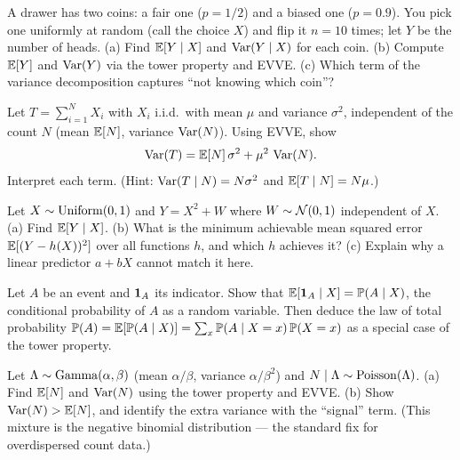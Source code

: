 \begin{exercise}
\label{ch15:exr-mixture}
A drawer has two coins: a fair one ($p=1/2$) and a biased one ($p=0.9$). You pick one uniformly at
random (call the choice $X$) and flip it $n = 10$ times; let $Y$ be the number of heads. (a) Find
$\operatorname{\mathbb{E}}[Y\mid X]$ and $\operatorname{Var}(Y\mid X)$ for each coin. (b) Compute $\operatorname{\mathbb{E}}[Y]$ and $\operatorname{Var}(Y)$ via the tower
property and EVVE. (c) Which term of the variance decomposition captures ``not knowing which coin''?
\end{exercise}

\begin{exercise}
\label{ch15:exr-random-sum}
Let $T = \sum_{i=1}^N X_i$ with $X_i$ i.i.d.\ with mean $\mu$ and variance $\sigma^2$, independent of the count
$N$ (mean $\operatorname{\mathbb{E}}[N]$, variance $\operatorname{Var}(N)$). Using EVVE, show
\[
  \operatorname{Var}(T) = \operatorname{\mathbb{E}}[N]\,\sigma^2 + \mu^2\,\operatorname{Var}(N).
\]
Interpret each term. (Hint: $\operatorname{Var}(T\mid N) = N\sigma^2$ and $\operatorname{\mathbb{E}}[T\mid N] = N\mu$.)
\end{exercise}

\begin{exercise}
\label{ch15:exr-best}
Let $X \sim \operatorname{Uniform}(0,1)$ and $Y = X^2 + W$ where $W \sim \mathcal{N}(0, 1)$ independent of $X$. (a) Find
$\operatorname{\mathbb{E}}[Y\mid X]$. (b) What is the minimum achievable mean squared error $\operatorname{\mathbb{E}}[(Y - h(X))^2]$ over all
functions $h$, and which $h$ achieves it? (c) Explain why a linear predictor $a + bX$ cannot match it
here.
\end{exercise}

\begin{exercise}
\label{ch15:exr-indicator}
Let $A$ be an event and $\mathbf{1}_A$ its indicator. Show that $\operatorname{\mathbb{E}}[\mathbf{1}_A \mid X] = \operatorname{\mathbb{P}}(A \mid X)$, the
conditional probability of $A$ as a random variable. Then deduce the law of total probability
$\operatorname{\mathbb{P}}(A) = \operatorname{\mathbb{E}}[\operatorname{\mathbb{P}}(A\mid X)] = \sum_x \operatorname{\mathbb{P}}(A\mid X=x)\operatorname{\mathbb{P}}(X=x)$ as a special case of the tower property.
\end{exercise}

\begin{exercise}[Overdispersion]
\label{ch15:exr-overdispersion}
Let $\Lambda \sim \operatorname{Gamma}(\alpha, \beta)$ (mean $\alpha/\beta$, variance $\alpha/\beta^2$) and
$N\mid\Lambda \sim \operatorname{Poisson}(\Lambda)$. (a) Find $\operatorname{\mathbb{E}}[N]$ and $\operatorname{Var}(N)$ using the tower property and EVVE.
(b) Show $\operatorname{Var}(N) > \operatorname{\mathbb{E}}[N]$, and identify the extra variance with the ``signal'' term. (This mixture is
the negative binomial distribution --- the standard fix for overdispersed count data.)
\end{exercise}

